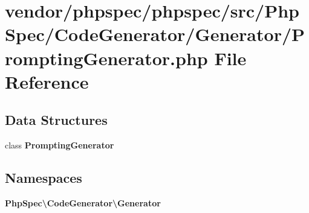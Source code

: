 \section{vendor/phpspec/phpspec/src/\+Php\+Spec/\+Code\+Generator/\+Generator/\+Prompting\+Generator.php File Reference}
\label{_prompting_generator_8php}
\subsection*{Data Structures}
\begin{DoxyCompactItemize}
\item 
class {\bf Prompting\+Generator}
\end{DoxyCompactItemize}
\subsection*{Namespaces}
\begin{DoxyCompactItemize}
\item 
 {\bf Php\+Spec\textbackslash{}\+Code\+Generator\textbackslash{}\+Generator}
\end{DoxyCompactItemize}
